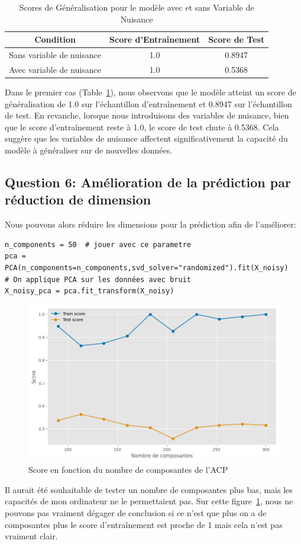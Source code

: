 \documentclass[11pt,a4paper]{article}
\begin{document}
\begin{table}[H]
    \centering
    \begin{tabular}{|ccc|}
        \hline
\textbf{Condition}& \textbf{Score d'Entraînement} & \textbf{Score de Test} \\ \hline
        Sans variable de nuisance& 1.0 & 0.8947  \\
        Avec variable de nuisance  & 1.0                           & 0.5368\\                 \hline
    \end{tabular}
    \caption{Scores de Généralisation pour le modèle avec et sans Variable de Nuisance}
    \label{table2}
\end{table}

Dans le premier cas (Table~\ref{table2}), nous observons que le modèle atteint un score de généralisation de 1.0 sur l'échantillon d'entraînement et 0.8947 sur l'échantillon de test. En revanche, lorsque nous introduisons des variables de nuisance, bien que le score d'entraînement reste à 1.0, le score de test chute à 0.5368. Cela suggère que les variables de nuisance affectent significativement la capacité du modèle à généraliser sur de nouvelles données.



\subsection{Question 6: Amélioration de la prédiction par réduction de dimension}

Nous pouvons alors réduire les dimensions pour la prédiction afin de l'améliorer:

\begin{verbatim}
n_components = 50  # jouer avec ce parametre
pca = PCA(n_components=n_components,svd_solver="randomized").fit(X_noisy)
# On applique PCA sur les données avec bruit
X_noisy_pca = pca.fit_transform(X_noisy)
\end{verbatim}


\begin{figure}[H]
    \centering
    \includegraphics[width=0.7\linewidth]{images_plot/graphPCA.png}
    \caption{Score en fonction du nombre de composantes de l'ACP}
    \label{fig:q6}
\end{figure}

Il aurait été souhaitable de tester un nombre de composantes plus bas, mais les capacités de mon ordinateur ne le permettaient pas.
Sur cette figure~\ref{fig:q6}, nous ne pouvons pas vraiment dégager de conclusion si ce n'est que plus on a de composantes plus le score d'entraînement est proche de 1 mais cela n'est pas vraiment clair.
\end{document}
